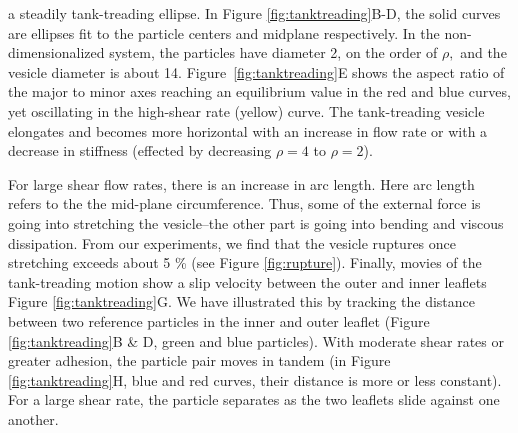 a steadily tank-treading ellipse. In Figure \ref{fig:tanktreading}B-D, the solid curves are ellipses fit to the particle centers
and midplane respectively. In the non-dimensionalized system, the particles have diameter 2, on the order of $\rho,$ 
and the vesicle diameter is about 14. 
Figure~\ref{fig:tanktreading}E shows the aspect ratio of the major to minor axes reaching an equilibrium value in the 
red and blue curves, yet oscillating in the high-shear rate (yellow) curve.
The tank-treading vesicle elongates and becomes more horizontal 
with an increase in flow rate or 
with a decrease in stiffness (effected by decreasing $\rho = 4$ to $\rho = 2$). 


For large shear flow rates, there is an increase in arc length. Here arc
length refers to the the mid-plane circumference. Thus, some of the
external force is going into stretching the vesicle--the other part is
going into bending and viscous dissipation. From our experiments, we
find that the vesicle ruptures once stretching exceeds about 5 \% (see
Figure \ref{fig:rupture}).  Finally, movies of the tank-treading motion
show a slip velocity between the outer and inner leaflets Figure
\ref{fig:tanktreading}G. We have illustrated this by tracking the
distance between two reference particles in the inner and outer leaflet
(Figure \ref{fig:tanktreading}B \& D, green and blue particles).  With
moderate shear rates or greater adhesion, the particle pair moves in
tandem (in Figure \ref{fig:tanktreading}H, blue and red curves, their
distance is more or less constant).  For a large shear rate, the
particle separates as the two leaflets slide against one another. 



%




